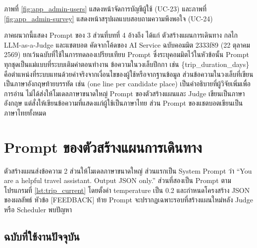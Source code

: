 ภาพที่ \ref{fig:app_admin-users} แสดงหน้าจัดการบัญชีผู้ใช้ (UC-23) และภาพที่ \ref{fig:app_admin-survey} แสดงหน้าสรุปผลแบบสอบถามความพึงพอใจ (UC-24)



ภาคผนวกนี้แสดง Prompt ของ 3 ส่วนที่บทที่ 4 อ้างถึง ได้แก่ ตัวสร้างแผนการเดินทาง กลไก LLM-as-a-Judge และแชตบอต คัดจากโค้ดของ AI Service ฉบับคอมมิต 2333f89 (22 ตุลาคม 2569) ยกเว้นฉบับที่ใช้ในการทดลองเปรียบเทียบ Prompt ซึ่งระบุคอมมิตไว้ในหัวข้อนั้น Prompt ทุกชุดเป็นแม่แบบที่ระบบเติมค่าตอนทำงาน ข้อความในวงเล็บปีกกา เช่น \{trip\_duration\_days\} คือตำแหน่งที่ระบบแทนด้วยค่าจริงจากเงื่อนไขของผู้ใช้หรือจากฐานข้อมูล ส่วนข้อความในวงเล็บที่เขียนเป็นภาษาอังกฤษท้ายบรรทัด เช่น (one line per candidate place) เป็นคำอธิบายที่ผู้วิจัยเพิ่มเพื่อการอ่าน ไม่ได้ส่งให้โมเดลภาษาขนาดใหญ่ Prompt ของตัวสร้างแผนและ Judge เขียนเป็นภาษาอังกฤษ แต่สั่งให้เขียนข้อความที่แสดงแก่ผู้ใช้เป็นภาษาไทย ส่วน Prompt ของแชตบอตเขียนเป็นภาษาไทยทั้งหมด

\section{Prompt ของตัวสร้างแผนการเดินทาง}

ตัวสร้างแผนส่งข้อความ 2 ส่วนให้โมเดลภาษาขนาดใหญ่ ส่วนแรกเป็น System Prompt ว่า ``You are a helpful travel assistant. Output JSON only.'' ส่วนที่สองเป็น Prompt ตามโปรแกรมที่ \ref{lst:trip_current} โดยตั้งค่า temperature เป็น 0.2 และกำหนดโครงสร้าง JSON ของผลลัพธ์ หัวข้อ [FEEDBACK] ท้าย Prompt จะปรากฏเฉพาะรอบที่สร้างแผนใหม่หลัง Judge หรือ Scheduler พบปัญหา

\subsection{ฉบับที่ใช้งานปัจจุบัน}




